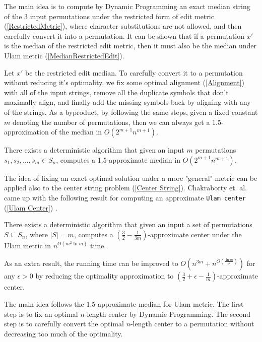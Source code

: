 The main idea is to compute by Dynamic Programming an exact median string of the 3 input permutations under the restricted form of edit metric (\ref{RestrictedMetric}), where character substitutions are not allowed, and then carefully convert it into a permutation. It can be shown that if a permutation $x'$ is the median of the restricted edit metric, then it must also be the median under Ulam metric (\ref{MedianRestrictedEdit}).

Let $x'$ be the restricted edit median. To carefully convert it to a permutation without reducing it's optimality, we fix some optimal alignment (\ref{Alignment}) with all of the input strings, remove all the duplicate symbols that don't maximally align, and finally add the missing symbols back by aligning with any of the strings. As a byproduct, by following the same steps, given a fixed constant $m$ denoting the number of permutations, then we can always get a 1.5-approximation of the median in $O(2^{m + 1} n^{m + 1})$.

\begin{theorem}
\label{DPApproxMedian}
    There exists a deterministic algorithm that given an input $m$ permutations $s_1, s_2, ..., s_m \in S_n$, computes a 1.5-approximate median in $O(2^{m + 1} n^{m + 1})$.
\end{theorem}

The idea of fixing an exact optimal solution under a more "general" metric can be applied also to the center string problem (\ref{Center String}). Chakraborty et. al. came up with the following result for computing an approximate \texttt{Ulam center} (\ref{Ulam Center}) \cite{UlamCenter}.

\begin{theorem}
    There exists a deterministic algorithm that given an input a set of permutations $S \subseteq S_n$, where $|S| = m$, computes a $(\frac{3}{2} - \frac{1}{3m})$-approximate center under the Ulam metric in $n^{O(m^2 \ln m)}$ time.

    As an extra result, the running time can be improved to $O\left(n^{3m} + n^{O(\frac{\ln m}{\epsilon^2})}\right)$ for any $\epsilon > 0$ by reducing the optimality approximation to $(\frac{3}{2} + \epsilon - \frac{1}{m})$-approximate center.
\end{theorem}

The main idea follows the $1.5$-approximate median for Ulam metric. The first step is to fix an optimal $n$-length center by Dynamic Programming. The second step is to carefully convert the optimal $n$-length center to a permutation without decreasing too much of the optimality.

